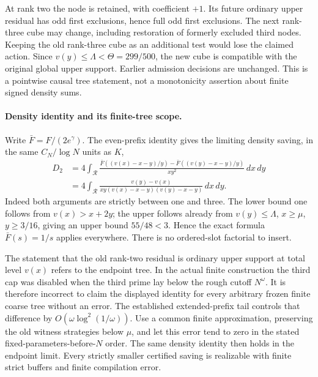 At rank two the node is retained, with coefficient $+1$. Its future
ordinary upper residual has odd first exclusions, hence full odd
first exclusions. The next rank-three cube may change, including
restoration of formerly excluded third nodes. Keeping the old
rank-three cube as an additional test would lose the claimed action.
Since $v(y)\le\Lambda<\Theta=299/500$, the new cube is compatible
with the original global upper support. Earlier admission decisions
are unchanged. This is a pointwise causal tree statement, not a
monotonicity assertion about finite signed density sums.

\paragraph{Density identity and its finite-tree scope.}
Write $\bar F=F/(2e^\gamma)$. The even-prefix identity gives the
limiting density saving, in the same $C_N/\log N$ units as $K$,
\begin{align*}
 D_2&=4\int_{\mathcal R}
 \frac{\bar F((v(x)-x-y)/y)-\bar F((v(y)-x-y)/y)}{xy^2}
 \,dx\,dy\\
 &=4\int_{\mathcal R}
 \frac{v(y)-v(x)}{xy(v(x)-x-y)(v(y)-x-y)}\,dx\,dy.
\end{align*}
Indeed both arguments are strictly between one and three. The lower
bound one follows from $v(x)>x+2y$; the upper follows already from
$v(y)\le\Lambda$, $x\ge\mu$, $y\ge3/16$, giving an upper bound
$55/48<3$. Hence the exact formula $\bar F(s)=1/s$ applies everywhere.
There is no ordered-slot factorial to insert.

The statement that the old rank-two residual is ordinary upper
support at total level $v(x)$ refers to the endpoint tree. In the
actual finite construction the third cap was disabled when the
third prime lay below the rough cutoff $N^\omega$. It is therefore
incorrect to claim the displayed identity for every arbitrary frozen
finite coarse tree without an error. The established extended-prefix
tail controls that difference by $O(\omega\log^2(1/\omega))$.
Use a common finite approximation, preserving the old witness
strategies below $\mu$, and let this error tend to zero in the stated
fixed-parameters-before-$N$ order. The same density identity then
holds in the endpoint limit. Every strictly smaller certified saving
is realizable with finite strict buffers and finite compilation error.

